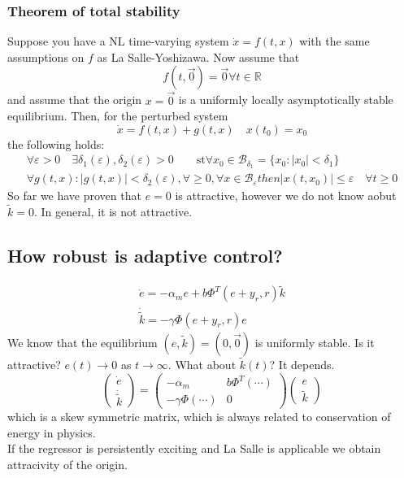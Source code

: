 \documentclass{book}
\begin{document}
\subsubsection{Theorem of total stability}
Suppose you have a NL time-varying system $\dot{x}=f(t,x)$ with the same assumptions on $f$ as La Salle-Yoshizawa. Now assume that \[
    f(t,\vec{0})=\vec{0} \forall t\in\mathbb{R}
\]
and assume that the origin $x=\vec{0}$ is a uniformly locally asymptotically stable equilibrium. Then, for the perturbed system 
\[
    \dot{x}=f(t,x)+g(t,x) \quad x(t_0)=x_0
\]
the following holds: 
\begin{gather*}
    \forall \varepsilon>0 \quad \exists \delta_1(\varepsilon), \delta_2(\varepsilon)>0 \qquad \text{st} \forall x_0\in\mathcal{B}_{\delta_1}=\{x_0:|x_0|<\delta_1\}\\
    \forall g(t,x): |g(t,x)|<\delta_2(\varepsilon), \forall \geq 0, \forall x\in\mathcal{B}_\varepsilon then |x(t,x_0)|\leq \varepsilon \quad \forall t \geq 0
\end{gather*}
So far we have proven that $e=0$ is attractive, however we do not know aobut $\tilde{k}=0$. In general, it is not attractive. 

\subsection{How robust is adaptive control?}
\begin{gather*}
    \dot{e}=-\alpha_me+b\Phi^T(e+y_r,r)\tilde{k}\\
    \dot{\tilde{k}}=-\gamma\Phi(e+y_r,r)e
\end{gather*}
We know that the equilibrium $(e,\tilde{k})=(0,\vec{0})$ is uniformly stable. Is it attractive? $e(t)\to 0$ as $t\to\infty$. What about $\tilde{k}(t)$? It depends. 
\[
    \begin{pmatrix}
        \dot{e} \\ \dot{\tilde{k}}
    \end{pmatrix} = \begin{pmatrix}
    -\alpha_m & b\Phi^T(\cdots) \\ -\gamma\Phi(\cdots) & 0
    \end{pmatrix} \begin{pmatrix}
    e \\ \tilde{k}
    \end{pmatrix}
\]
which is a skew symmetric matrix, which is always related to conservation of energy in physics. 
\\If the regressor is persistently exciting and La Salle is applicable we obtain attracivity of the origin.
\end{document}
